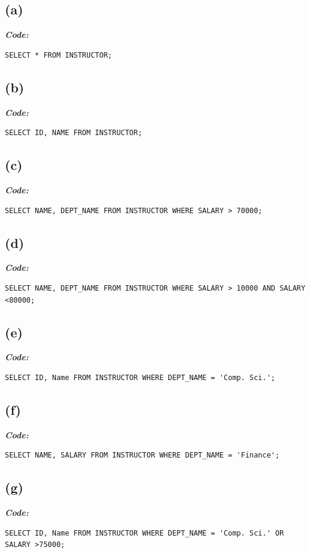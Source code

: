 \documentclass[a4paper, left=1in, right=1in,12pt]{article}
\begin{document}
\subsection*{(a)}
\textbf{\textit{\large Code:}}
\begin{verbatim}
SELECT * FROM INSTRUCTOR;
\end{verbatim}

\subsection*{(b)}
\textbf{\textit{\large Code:}}
\begin{verbatim}
SELECT ID, NAME FROM INSTRUCTOR;
\end{verbatim}

\subsection*{(c)}
\textbf{\textit{\large Code:}}
\begin{verbatim}
SELECT NAME, DEPT_NAME FROM INSTRUCTOR WHERE SALARY > 70000;
\end{verbatim}

\subsection*{(d)}
\textbf{\textit{\large Code:}}
\begin{verbatim}
SELECT NAME, DEPT_NAME FROM INSTRUCTOR WHERE SALARY > 10000 AND SALARY <80000;
\end{verbatim}

\subsection*{(e)}
\textbf{\textit{\large Code:}}
\begin{verbatim}
SELECT ID, Name FROM INSTRUCTOR WHERE DEPT_NAME = 'Comp. Sci.';
\end{verbatim}

\subsection*{(f)}
\textbf{\textit{\large Code:}}
\begin{verbatim}
SELECT NAME, SALARY FROM INSTRUCTOR WHERE DEPT_NAME = 'Finance';
\end{verbatim}

\subsection*{(g)}
\textbf{\textit{\large Code:}}
\begin{verbatim}
SELECT ID, Name FROM INSTRUCTOR WHERE DEPT_NAME = 'Comp. Sci.' OR SALARY >75000;
\end{verbatim}
\end{document}

